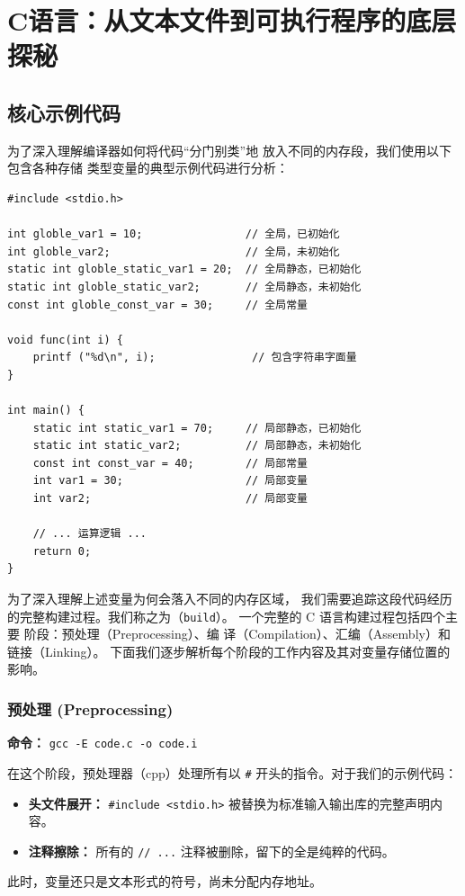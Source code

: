 \section{C语言：从文本文件到可执行程序的底层探秘}

\subsection{核心示例代码}
为了深入理解编译器如何将代码“分门别类”地
放入不同的内存段，我们使用以下包含各种存储
类型变量的典型示例代码进行分析：

\begin{lstlisting}[caption={内存段示例代码},label={lst:memory_segments}]
#include <stdio.h>

int globle_var1 = 10;                // 全局，已初始化
int globle_var2;                     // 全局，未初始化
static int globle_static_var1 = 20;  // 全局静态，已初始化
static int globle_static_var2;       // 全局静态，未初始化
const int globle_const_var = 30;     // 全局常量

void func(int i) {
    printf ("%d\n", i);               // 包含字符串字面量
}

int main() {
    static int static_var1 = 70;     // 局部静态，已初始化
    static int static_var2;          // 局部静态，未初始化
    const int const_var = 40;        // 局部常量
    int var1 = 30;                   // 局部变量
    int var2;                        // 局部变量
    
    // ... 运算逻辑 ...
    return 0;
}
\end{lstlisting}
\newpage


为了深入理解上述变量为何会落入不同的内存区域，
我们需要追踪这段代码经历的完整构建过程。我们称之为（\texttt{build}）。
一个完整的 C 语言构建过程包括四个主要
阶段：预处理（Preprocessing）、编
译（Compilation）、汇编（Assembly）和链接（Linking）。
下面我们逐步解析每个阶段的工作内容及其对变量存储位置的影响。

\subsubsection{预处理 (Preprocessing)}
\textbf{命令：} \texttt{gcc -E code.c -o code.i}

在这个阶段，预处理器（cpp）处理所有以 \texttt{\#} 开头的指令。对于我们的示例代码：
\begin{itemize}
    \item \textbf{头文件展开：} \texttt{\#include <stdio.h>} 被替换为标准输入输出库的完整声明内容。
    \item \textbf{注释擦除：} 所有的 \texttt{// ...} 注释被删除，留下的全是纯粹的代码。
\end{itemize}
此时，变量还只是文本形式的符号，尚未分配内存地址。

